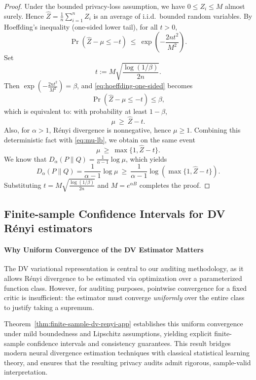 \documentclass{article}
\theoremstyle{plain}
\theoremstyle{definition}
\theoremstyle{remark}
\begin{document}
\begin{proof}
Under the bounded privacy-loss assumption, we have $0\le Z_i\le M$ almost surely.
Hence $\widehat Z = \frac1n\sum_{i=1}^n Z_i$ is an average of i.i.d.\ bounded random variables.
By Hoeffding's inequality (one-sided lower tail), for all $t>0$,
\begin{equation}
\label{eq:hoeffding-one-sided}
\Pr\left(\widehat Z - \mu \le -t\right)\ \le\ \exp\left(-\frac{2nt^2}{M^2}\right).
\end{equation}
Set
\[
t := M\sqrt{\frac{\log(1/\beta)}{2n}}.
\]
Then $\exp\left(-\frac{2nt^2}{M^2}\right)=\beta$, and \eqref{eq:hoeffding-one-sided} becomes
\[
\Pr\left(\widehat Z - \mu \le -t\right)\le \beta,
\]
which is equivalent to: with probability at least $1-\beta$,
\begin{equation}
\label{eq:mu-lb}
\mu \ \ge\ \widehat Z - t.
\end{equation}
Also, for $\alpha>1$, R\'enyi divergence is nonnegative, hence $\mu\ge 1$.
Combining this deterministic fact with \eqref{eq:mu-lb}, we obtain on the same event
\[
\mu \ \ge\ \max\{1,\widehat Z - t\}.
\]
We know that $D_\alpha(P\|Q)=\frac1{\alpha-1}\log \mu$, which yields
\[
D_\alpha(P\|Q)
= \frac{1}{\alpha-1}\log \mu
\ \ge\
\frac{1}{\alpha-1}\log\!\left(\max\{1,\widehat Z - t\}\right).
\]
Substituting $t = M\sqrt{\frac{\log(1/\beta)}{2n}}$ and $M=e^{\alpha B}$ completes the proof.
\end{proof}

\subsection{Finite-sample Confidence Intervals for DV R\'enyi estimators}

\paragraph{Why Uniform Convergence of the DV Estimator Matters}
The DV variational representation is central to our auditing methodology,
as it allows R\'enyi divergence to be estimated via optimization over a parameterized function class.
However, for auditing purposes, pointwise convergence for a fixed critic is insufficient:
the estimator must converge \emph{uniformly} over the entire class to justify taking a supremum.

Theorem~\ref{thm:finite-sample-dv-renyi-app} establishes this uniform convergence under mild boundedness and Lipschitz assumptions,
yielding explicit finite-sample confidence intervals and consistency guarantees.
This result bridges modern neural divergence estimation techniques with classical statistical learning theory,
and ensures that the resulting privacy audits admit rigorous, sample-valid interpretation.
\end{document}

